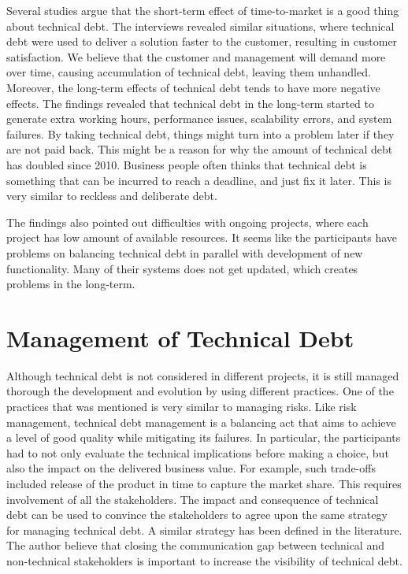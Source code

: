 Several studies argue that the short-term effect of time-to-market is a good thing about technical debt\cite{lim-taksande,p247-siebra}. The interviews revealed similar situations, where technical debt were used to deliver a solution faster to the customer, resulting in customer satisfaction. We believe that the customer and management will demand more over time, causing accumulation of technical debt, leaving them unhandled. Moreover, the long-term effects of technical debt tends to have more negative effects\cite{lim-taksande,p247-siebra,buschmann2011pay}. The findings revealed that technical debt in the long-term started to generate extra working hours, performance issues, scalability errors, and system failures. By taking technical debt, things might turn into a problem later if they are not paid back. This might be a reason for why the amount of technical debt has doubled since 2010\cite{gartner2010}. Business people often thinks that technical debt is something that can be incurred to reach a deadline, and just fix it later. This is very similar to reckless and deliberate debt\cite{url-fowler}.

The findings also pointed out difficulties with ongoing projects, where each project has low amount of available resources. It seems like the participants have problems on balancing technical debt in parallel with development of new functionality. Many of their systems does not get updated, which creates problems in the long-term.







\section{Management of Technical Debt}
Although technical debt is not considered in different projects, it is still managed thorough the development and evolution by using different practices. One of the practices that was mentioned is very similar to managing risks. Like risk management, technical debt management is a balancing act that aims to achieve a level of good quality while mitigating its failures. In particular, the participants had to not only evaluate the technical implications before making a choice, but also the impact on the delivered business value. For example, such trade-offs included release of the product in time to capture the market share. This requires involvement of all the stakeholders. The impact and consequence of technical debt can be used to convince the stakeholders to agree upon the same strategy for managing technical debt. A similar strategy has been defined in the literature\cite{lim-taksande,Theodoropoulos:2011:TDS:1985362.1985373}. The author believe that closing the communication gap between technical and non-technical stakeholders is important to increase the visibility of technical debt. 

